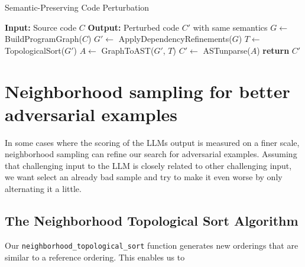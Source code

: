 \documentclass[%
thesis=student,%
coverpage=false,%
titlepage=false,%
headmarks=true, %
english,%
font=libertine, %
math=newpxtx, %
BCOR=5mm,%
coverBCOR=11mm%
]{tum-templates/book/tumbook}
\begin{document}
\begin{algorithm}
\caption{Semantic-Preserving Code Perturbation}
\begin{algorithmic}[1]
\State \textbf{Input:} Source code $C$
\State \textbf{Output:} Perturbed code $C'$ with same semantics
\State $G \gets$ BuildProgramGraph($C$) 
\State $G' \gets$ ApplyDependencyRefinements($G$)
\State $T \gets$ TopologicalSort($G'$)
\State $A \gets$ GraphToAST($G'$, $T$) 
\State $C' \gets$ ASTunparse($A$)
\State \textbf{return} $C'$
\end{algorithmic}
\end{algorithm}

\section{Neighborhood sampling for better adversarial examples}
\label{sec:Neighborhood_sampling}
In some cases where the scoring of the LLMs output is measured on a finer scale, neighborhood sampling can refine our search for adversarial examples. Assuming that challenging input to the LLM is closely related to other challenging input, we want select an already bad sample and try to make it even worse by only alternating it a little.

\subsection{The Neighborhood Topological Sort Algorithm}

Our \texttt{neighborhood\_topological\_sort} function generates new orderings that are similar to a reference ordering. This enables us to 
\end{document}
